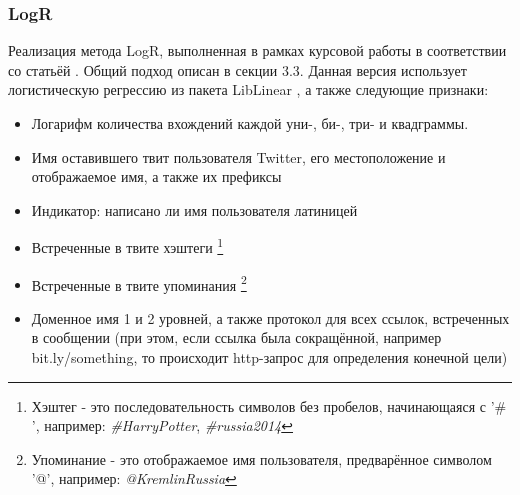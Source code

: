 \documentclass[a4paper, 14pt]{article}
\begin{document}
			\subsubsection{LogR}
			Реализация метода LogR, выполненная в рамках курсовой работы в соответствии со статьёй \cite{ppm}. Общий подход описан в секции 3.3. Данная версия использует логистическую регрессию из пакета LibLinear \cite{fan}, а также следующие признаки:
			\begin{itemize}
				\item Логарифм количества вхождений каждой уни-, би-, три- и квадграммы.
				\item Имя оставившего твит пользователя Twitter, его местоположение и отображаемое имя, а также их префиксы
				\item Индикатор: написано ли имя пользователя латиницей
				\item Встреченные в твите хэштеги
					\footnote{Хэштег - это последовательность символов без пробелов, начинающаяся с '$\#$', например: \textit{\#HarryPotter}, \textit{\#russia2014}}
				\item Встреченные в твите упоминания
					\footnote{Упоминание - это отображаемое имя пользователя, предварённое символом '@', например: \textit{@KremlinRussia}}
				\item Доменное имя 1 и 2 уровней, а также протокол для всех ссылок, встреченных в сообщении (при этом, если ссылка была сокращённой,
				например bit.ly/something, то происходит http-запрос для определения конечной цели)
			\end{itemize}
\end{document}

